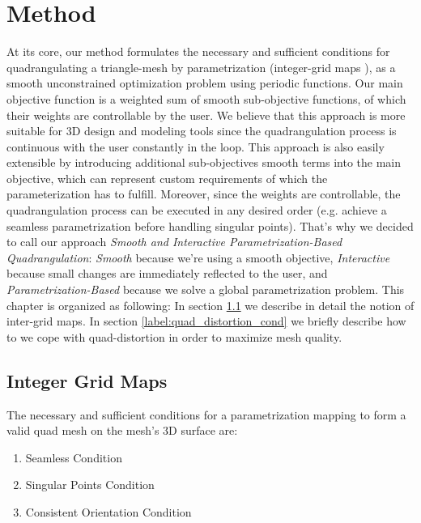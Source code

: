 \chapter{Method}
At its core, our method formulates the necessary and sufficient conditions for quadrangulating a triangle-mesh by parametrization (integer-grid maps \cite{bommes:hal-00862648}), as a smooth unconstrained optimization problem using periodic functions. Our main objective function is a weighted sum of smooth sub-objective functions, of which their weights are controllable by the user. We believe that this approach is more suitable for 3D design and modeling tools since the quadrangulation process is continuous with the user constantly in the loop. This approach is also easily extensible by introducing additional sub-objectives smooth terms into the main objective, which can represent custom requirements of which the parameterization has to fulfill. Moreover, since the weights are controllable, the quadrangulation process can be executed in any desired order (e.g. achieve a seamless parametrization before handling singular points). That's why we decided  to call our approach \emph{Smooth and Interactive Parametrization-Based Quadrangulation}: \emph{Smooth} because we're using a smooth objective, \emph{Interactive} because small changes are immediately reflected to the user, and \emph{Parametrization-Based} because we solve a global parametrization problem. This chapter is organized as following: In section \ref{integer-grid-maps} we describe in detail the notion of inter-grid maps. In section \ref{label:quad_distortion_cond} we briefly describe how to we cope with quad-distortion in order to maximize mesh quality.
\section{Integer Grid Maps}
\label{integer-grid-maps}
The necessary and sufficient conditions for a parametrization mapping to form a valid quad mesh on the mesh's 3D surface are:
\begin{enumerate}
\item Seamless Condition
\item Singular Points Condition
\item Consistent Orientation Condition
\end{enumerate}

